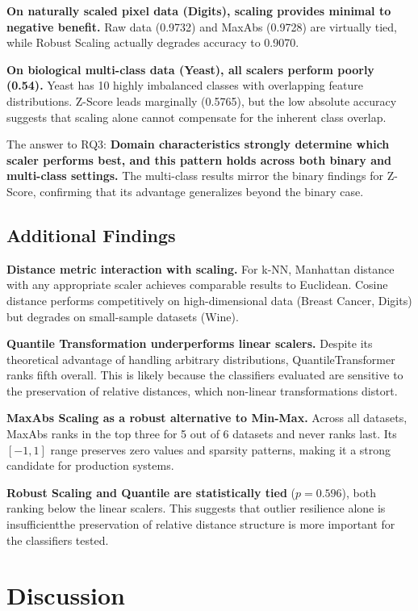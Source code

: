 \documentclass[12pt,a4paper]{article}
\begin{document}
\textbf{On naturally scaled pixel data (Digits), scaling provides minimal to negative benefit.} Raw data (0.9732) and MaxAbs (0.9728) are virtually tied, while Robust Scaling actually degrades accuracy to 0.9070.

\textbf{On biological multi-class data (Yeast), all scalers perform poorly (0.54).} Yeast has 10 highly imbalanced classes with overlapping feature distributions. Z-Score leads marginally (0.5765), but the low absolute accuracy suggests that scaling alone cannot compensate for the inherent class overlap.

The answer to RQ3: \textbf{Domain characteristics strongly determine which scaler performs best, and this pattern holds across both binary and multi-class settings.} The multi-class results mirror the binary findings for Z-Score, confirming that its advantage generalizes beyond the binary case.

\subsection{Additional Findings}
\label{sec:additional}

\textbf{Distance metric interaction with scaling.} For k-NN, Manhattan distance with any appropriate scaler achieves comparable results to Euclidean. Cosine distance performs competitively on high-dimensional data (Breast Cancer, Digits) but degrades on small-sample datasets (Wine).

\textbf{Quantile Transformation underperforms linear scalers.} Despite its theoretical advantage of handling arbitrary distributions, QuantileTransformer ranks fifth overall. This is likely because the classifiers evaluated are sensitive to the preservation of relative distances, which non-linear transformations distort.

\textbf{MaxAbs Scaling as a robust alternative to Min-Max.} Across all datasets, MaxAbs ranks in the top three for 5 out of 6 datasets and never ranks last. Its $[-1, 1]$ range preserves zero values and sparsity patterns, making it a strong candidate for production systems.

\textbf{Robust Scaling and Quantile are statistically tied} ($p = 0.596$), both ranking below the linear scalers. This suggests that outlier resilience alone is insufficient\textemdash the preservation of relative distance structure is more important for the classifiers tested.

\section{Discussion}
\label{sec:discussion}
\end{document}
